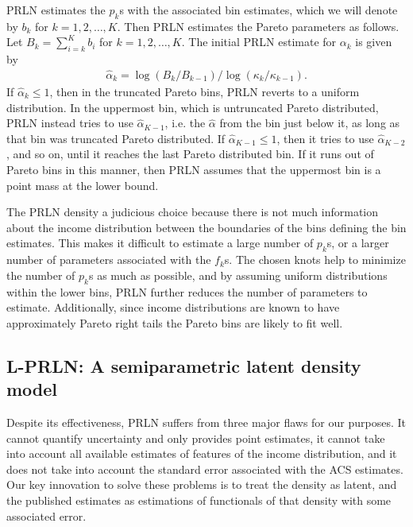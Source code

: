 \documentclass[12pt]{article}
\begin{document}
PRLN estimates the $p_k$s with the associated bin estimates, which we will denote by $b_k$ for $k=1,2,\dots,K$. Then PRLN estimates the Pareto parameters as follows. Let $B_k = \sum_{i=k}^Kb_i$ for $k=1,2,\dots,K$. The initial PRLN estimate for $\alpha_k$ is given by
\begin{align*}
\widehat{\alpha}_k = \log(B_k/B_{k-1}) / \log(\kappa_k / \kappa_{k-1}).
\end{align*}
If $\widehat{\alpha}_k \leq 1$, then in the truncated Pareto bins, PRLN reverts to a uniform distribution. In the uppermost bin, which is untruncated Pareto distributed, PRLN instead tries to use $\widehat{\alpha}_{K-1}$, i.e. the $\widehat{\alpha}$ from the bin just below it, as long as that bin was truncated Pareto distributed. If $\widehat{\alpha}_{K-1} \leq 1$, then it tries to use $\widehat{\alpha}_{K-2}$, and so on, until it reaches the last Pareto distributed bin. If it runs out of Pareto bins in this manner, then PRLN assumes that the uppermost bin is a point mass at the lower bound.

The PRLN density a judicious choice because there is not much information about the income distribution between the boundaries of the bins defining the bin estimates. This makes it difficult to estimate a large number of $p_k$s, or a larger number of parameters associated with the $f_k$s. The chosen knots help to minimize the number of $p_k$s as much as possible, and by assuming uniform distributions within the lower bins, PRLN further reduces the number of parameters to estimate. Additionally, since income distributions are known to have approximately Pareto right tails the Pareto bins are likely to fit well.

\subsection{L-PRLN: A semiparametric latent density model}\label{sec:model}
Despite its effectiveness, PRLN suffers from three major flaws for our purposes. It cannot quantify uncertainty and only provides point estimates, it cannot take into account all available estimates of features of the income distribution, and it does not take into account the standard error associated with the ACS estimates. Our key innovation to solve these problems is to treat the density as latent, and the published estimates as estimations of functionals of that density with some associated error. 
\end{document}
